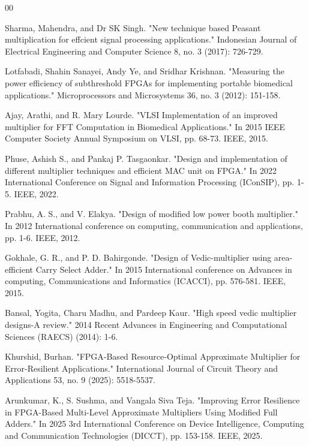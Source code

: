 \documentclass[conference]{IEEEtran}
\begin{document}
\begin{thebibliography}{00}

Sharma, Mahendra, and Dr SK Singh. "New technique based Peasant multiplication for effcient signal processing applications." Indonesian Journal of Electrical Engineering and Computer Science 8, no. 3 (2017): 726-729.

Lotfabadi, Shahin Sanayei, Andy Ye, and Sridhar Krishnan. "Measuring the power efficiency of subthreshold FPGAs for implementing portable biomedical applications." Microprocessors and Microsystems 36, no. 3 (2012): 151-158.

Ajay, Arathi, and R. Mary Lourde. "VLSI Implementation of an improved multiplier for FFT Computation in Biomedical Applications." In 2015 IEEE Computer Society Annual Symposium on VLSI, pp. 68-73. IEEE, 2015.

Phuse, Ashish S., and Pankaj P. Tasgaonkar. "Design and implementation of different multiplier techniques and efficient MAC unit on FPGA." In 2022 International Conference on Signal and Information Processing (IConSIP), pp. 1-5. IEEE, 2022.

Prabhu, A. S., and V. Elakya. "Design of modified low power booth multiplier." In 2012 International conference on computing, communication and applications, pp. 1-6. IEEE, 2012.

Gokhale, G. R., and P. D. Bahirgonde. "Design of Vedic-multiplier using area-efficient Carry Select Adder." In 2015 International conference on Advances in computing, Communications and Informatics (ICACCI), pp. 576-581. IEEE, 2015.

Bansal, Yogita, Charu Madhu, and Pardeep Kaur. "High speed vedic multiplier designs-A review." 2014 Recent Advances in Engineering and Computational Sciences (RAECS) (2014): 1-6.

Khurshid, Burhan. "FPGA‐Based Resource‐Optimal Approximate Multiplier for Error‐Resilient Applications." International Journal of Circuit Theory and Applications 53, no. 9 (2025): 5518-5537.

Arunkumar, K., S. Sushma, and Vangala Siva Teja. "Improving Error Resilience in FPGA-Based Multi-Level Approximate Multipliers Using Modified Full Adders." In 2025 3rd International Conference on Device Intelligence, Computing and Communication Technologies (DICCT), pp. 153-158. IEEE, 2025.


\end{thebibliography}
\end{document}
